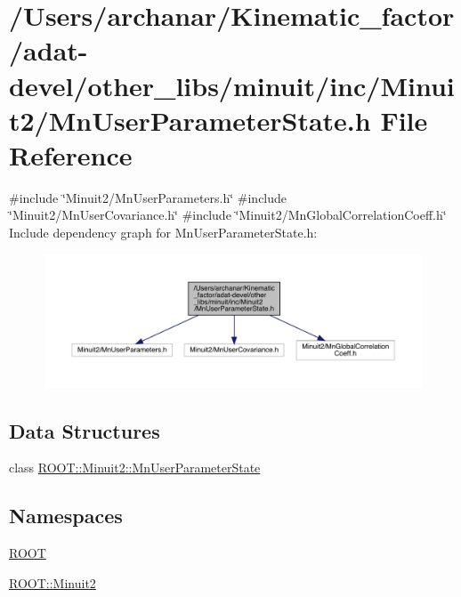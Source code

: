 \hypertarget{adat-devel_2other__libs_2minuit_2inc_2Minuit2_2MnUserParameterState_8h}{}\section{/\+Users/archanar/\+Kinematic\+\_\+factor/adat-\/devel/other\+\_\+libs/minuit/inc/\+Minuit2/\+Mn\+User\+Parameter\+State.h File Reference}
\label{adat-devel_2other__libs_2minuit_2inc_2Minuit2_2MnUserParameterState_8h}
{\ttfamily \#include \char`\"{}Minuit2/\+Mn\+User\+Parameters.\+h\char`\"{}}\newline
{\ttfamily \#include \char`\"{}Minuit2/\+Mn\+User\+Covariance.\+h\char`\"{}}\newline
{\ttfamily \#include \char`\"{}Minuit2/\+Mn\+Global\+Correlation\+Coeff.\+h\char`\"{}}\newline
Include dependency graph for Mn\+User\+Parameter\+State.\+h\+:
\nopagebreak
\begin{figure}[H]
\begin{center}
\leavevmode
\includegraphics[width=350pt]{db/d2c/adat-devel_2other__libs_2minuit_2inc_2Minuit2_2MnUserParameterState_8h__incl}
\end{center}
\end{figure}
\subsection*{Data Structures}
\begin{DoxyCompactItemize}
\item 
class \mbox{\hyperlink{classROOT_1_1Minuit2_1_1MnUserParameterState}{R\+O\+O\+T\+::\+Minuit2\+::\+Mn\+User\+Parameter\+State}}
\end{DoxyCompactItemize}
\subsection*{Namespaces}
\begin{DoxyCompactItemize}
\item 
 \mbox{\hyperlink{namespaceROOT}{R\+O\+OT}}
\item 
 \mbox{\hyperlink{namespaceROOT_1_1Minuit2}{R\+O\+O\+T\+::\+Minuit2}}
\end{DoxyCompactItemize}
